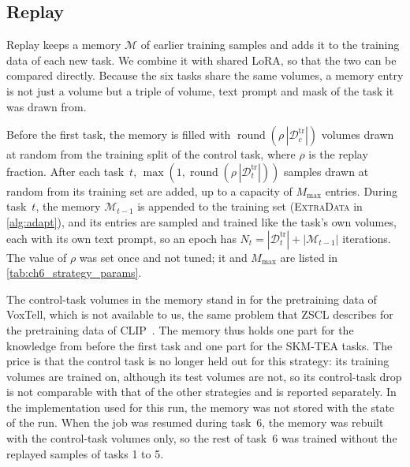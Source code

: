 \subsection{Replay}
\label{subsec:method-replay}

Replay keeps a memory $\mathcal{M}$ of earlier training samples and adds it to the training data of each new task.
We combine it with shared LoRA, so that the two can be compared directly.
Because the six tasks share the same volumes, a memory entry is not just a volume but a triple of volume, text prompt and mask of the task it was drawn from.

Before the first task, the memory is filled with $\operatorname{round}(\rho \, |\mathcal{D}_c^{\mathrm{tr}}|)$ volumes drawn at random from the training split of the control task, where $\rho$ is the replay fraction.
After each task~$t$, $\max(1, \operatorname{round}(\rho \, |\mathcal{D}_t^{\mathrm{tr}}|))$ samples drawn at random from its training set are added, up to a capacity of $M_{\max}$ entries.
During task~$t$, the memory $\mathcal{M}_{t-1}$ is appended to the training set (\textsc{ExtraData} in \cref{alg:adapt}), and its entries are sampled and trained like the task's own volumes, each with its own text prompt, so an epoch has $N_t = |\mathcal{D}_t^{\mathrm{tr}}| + |\mathcal{M}_{t-1}|$ iterations.
The value of $\rho$ was set once and not tuned; it and $M_{\max}$ are listed in \cref{tab:ch6_strategy_params}.

The control-task volumes in the memory stand in for the pretraining data of VoxTell, which is not available to us, the same problem that ZSCL describes for the pretraining data of CLIP~\cite{zheng2023preventingzeroshottransferdegradation}.
The memory thus holds one part for the knowledge from before the first task and one part for the SKM-TEA tasks.
The price is that the control task is no longer held out for this strategy: its training volumes are trained on, although its test volumes are not, so its control-task drop is not comparable with that of the other strategies and is reported separately.
In the implementation used for this run, the memory was not stored with the state of the run.
When the job was resumed during task~6, the memory was rebuilt with the control-task volumes only, so the rest of task~6 was trained without the replayed samples of tasks 1 to 5.

